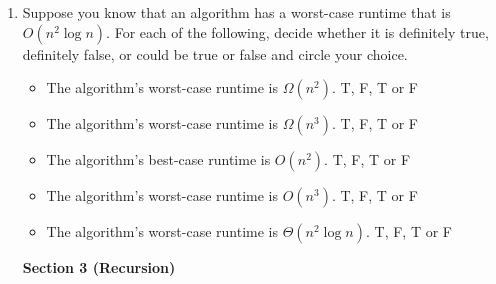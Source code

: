\documentclass[11pt]{article}
\begin{document}
\begin{enumerate}
    \begin{itemize}
        \item[\underline{\hspace{0.5cm}}] $n \log n^3$
        \item[\underline{\hspace{0.5cm}}] $n \log n^2$
        \item[\underline{\hspace{0.5cm}}] $\sqrt{n}$
        \item[\underline{\hspace{0.5cm}}] $n + \log n$
        \item[\underline{\hspace{0.5cm}}] $n^{\log_3 2}$
        \item[\underline{\hspace{0.5cm}}] $100^{100!}$
        \item[\underline{\hspace{0.5cm}}] $\log_2 n$
        \item[\underline{\hspace{0.5cm}}] $2^n$
        \item[\underline{\hspace{0.5cm}}] $3^n$
    \end{itemize}

    \newpage

\item

Suppose you know that an algorithm has a worst-case runtime that is $O(n^2 \log n)$. For each of the following, decide whether it is definitely true, definitely false, or could be true or false and circle your choice. 

\begin{itemize}
    \item The algorithm's worst-case runtime is $\Omega(n^2)$. T, F, T or F
    \item The algorithm's worst-case runtime is $\Omega(n^3)$. T, F, T or F
    \item The algorithm's best-case runtime is $O(n^2)$. T, F, T or F
    \item The algorithm's worst-case runtime is $O(n^3)$. T, F, T or F
    \item The algorithm's worst-case runtime is $\Theta(n^2 \log n)$. T, F, T or F
\end{itemize}



\newpage

\begin{center}
\LARGE\textbf{Section 3 (Recursion)\\}%
\end{center}
 


\end{enumerate}
\end{document}
